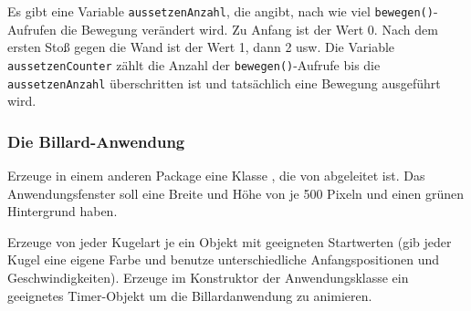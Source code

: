 Es gibt eine Variable \verb|aussetzenAnzahl|, die angibt, nach wie viel
\verb|bewegen()|-Aufrufen die Bewegung verändert wird. Zu Anfang ist der Wert 0.
Nach dem ersten Stoß gegen die Wand ist der Wert 1, dann 2 usw.
Die Variable \verb|aussetzenCounter| zählt die Anzahl der
\verb|bewegen()|-Aufrufe bis die \verb|aussetzenAnzahl| überschritten ist und
tatsächlich eine Bewegung ausgeführt wird.


\subsubsection{Die Billard-Anwendung}

Erzeuge in einem anderen Package eine Klasse , die von
 abgeleitet ist. Das Anwendungsfenster soll eine Breite und
Höhe von je 500 Pixeln und einen grünen Hintergrund haben.

Erzeuge von jeder Kugelart je ein Objekt mit geeigneten Startwerten (gib jeder
Kugel eine eigene Farbe und benutze unterschiedliche Anfangspositionen und
Geschwindigkeiten). Erzeuge im Konstruktor der Anwendungsklasse ein geeignetes
Timer-Objekt um die Billardanwendung zu animieren.
